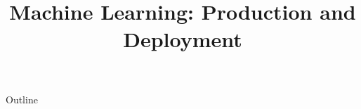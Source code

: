 \documentclass[xcolor=dvipsnames,compress,t,pdf,9pt]{beamer}
\title[\insertframenumber /\inserttotalframenumber]{Machine Learning: Production and Deployment}
\begin{document}
	\begin{frame}
	\titlepage
	\end{frame}

	\begin{frame}{Outline}
	    \tableofcontents
	\end{frame}

	
	
	
\end{document}
